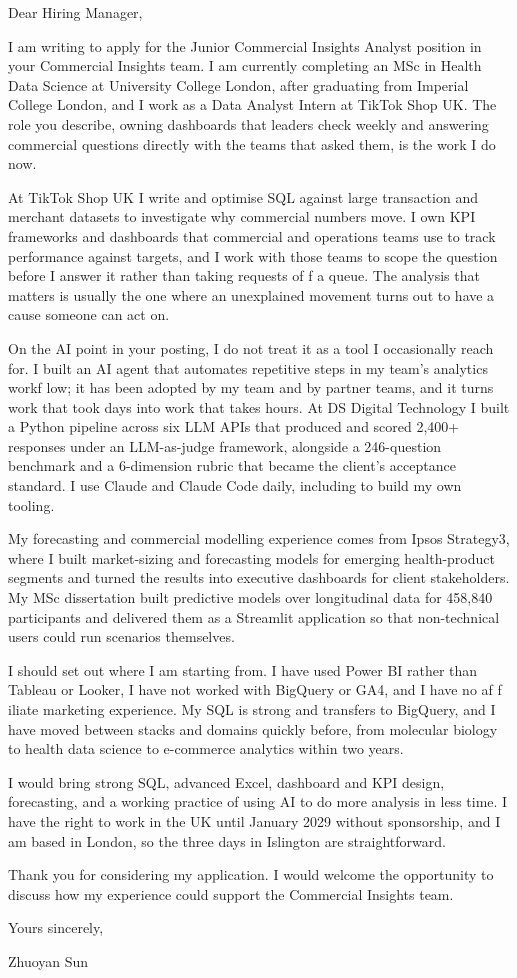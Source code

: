 \documentclass[letterpaper,11pt]{article}
\begin{document}
Dear Hiring Manager,

I am writing to apply for the Junior Commercial Insights Analyst position in your Commercial Insights team. I am currently completing an MSc in Health Data Science at University College London, after graduating from Imperial College London, and I work as a Data Analyst Intern at TikTok Shop UK. The role you describe, owning dashboards that leaders check weekly and answering commercial questions directly with the teams that asked them, is the work I do now.

At TikTok Shop UK I write and optimise SQL against large transaction and merchant datasets to investigate why commercial numbers move. I own KPI frameworks and dashboards that commercial and operations teams use to track performance against targets, and I work with those teams to scope the question before I answer it rather than taking requests of\kern0pt f a queue. The analysis that matters is usually the one where an unexplained movement turns out to have a cause someone can act on.

On the AI point in your posting, I do not treat it as a tool I occasionally reach for. I built an AI agent that automates repetitive steps in my team's analytics workf\kern0pt low; it has been adopted by my team and by partner teams, and it turns work that took days into work that takes hours. At DS Digital Technology I built a Python pipeline across six LLM APIs that produced and scored 2,400+ responses under an LLM-as-judge framework, alongside a 246-question benchmark and a 6-dimension rubric that became the client's acceptance standard. I use Claude and Claude Code daily, including to build my own tooling.

My forecasting and commercial modelling experience comes from Ipsos Strategy3, where I built market-sizing and forecasting models for emerging health-product segments and turned the results into executive dashboards for client stakeholders. My MSc dissertation built predictive models over longitudinal data for 458,840 participants and delivered them as a Streamlit application so that non-technical users could run scenarios themselves.

I should set out where I am starting from. I have used Power BI rather than Tableau or Looker, I have not worked with BigQuery or GA4, and I have no af\kern0pt f\kern0pt iliate marketing experience. My SQL is strong and transfers to BigQuery, and I have moved between stacks and domains quickly before, from molecular biology to health data science to e-commerce analytics within two years.

I would bring strong SQL, advanced Excel, dashboard and KPI design, forecasting, and a working practice of using AI to do more analysis in less time. I have the right to work in the UK until January 2029 without sponsorship, and I am based in London, so the three days in Islington are straightforward.

Thank you for considering my application. I would welcome the opportunity to discuss how my experience could support the Commercial Insights team.

\vspace{2pt}
Yours sincerely,

\vspace{8pt}
Zhuoyan Sun
\end{document}
